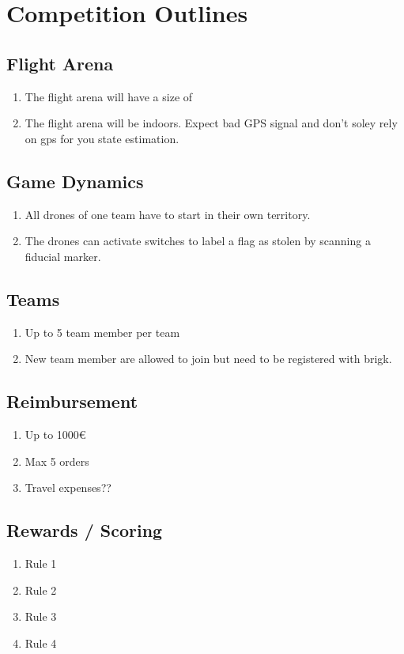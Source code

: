 \section{Competition Outlines}

\subsection{Flight Arena}
\begin{enumerate}
	\item{The flight arena will have a size of}
	\item{The flight arena will be indoors. Expect bad GPS signal and don't soley rely on gps for you state estimation.}
\end{enumerate}

\subsection{Game Dynamics}
\begin{enumerate}
	\item{All drones of one team have to start in their own territory.}
	\item{The drones can activate switches to label a flag as stolen by scanning a fiducial marker.}
\end{enumerate}

\subsection{Teams}
\begin{enumerate}
	\item{Up to 5 team member per team}
	\item{New team member are allowed to join but need to be registered with brigk.}
\end{enumerate}

\subsection{Reimbursement}
\begin{enumerate}
	\item{Up to 1000€}
	\item{Max 5 orders}
	\item{Travel expenses??}
\end{enumerate}

\subsection{Rewards / Scoring}
\begin{enumerate}
	\item{Rule 1}
	\item{Rule 2}
	\item{Rule 3}
	\item{Rule 4}
\end{enumerate}

